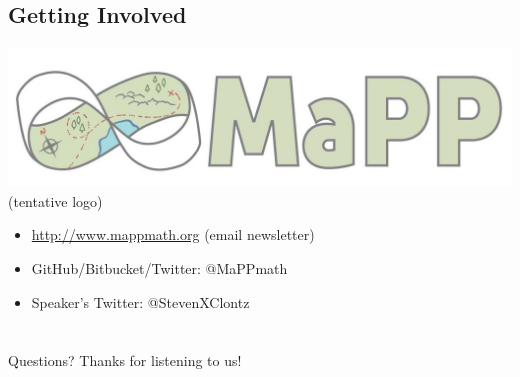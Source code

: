 \documentclass{beamer}
\begin{document}
\subsection{Getting Involved}
\begin{frame}
  \begin{center}\tiny
    \includegraphics[height=10em]
    {mapp_logo_draft.jpg} \\
    (tentative logo)
  \end{center}
  \begin{itemize}
    \item \url{http://www.mappmath.org} (email newsletter)
    \item GitHub/Bitbucket/Twitter: @MaPPmath
    \item Speaker's Twitter: @StevenXClontz
  \end{itemize}
\end{frame}

\section*{}

\begin{frame}
Questions? Thanks for listening to us!
\end{frame}
\end{document}
